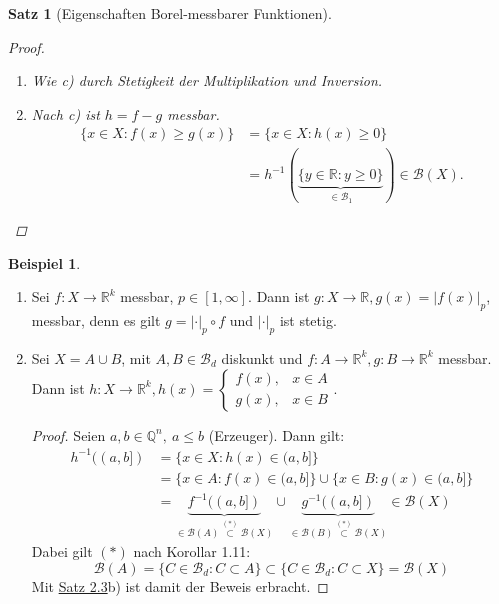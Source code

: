 \documentclass[a4paper]{report}
\newcommand{\R}{\mathbb{R}}
\newcommand{\Q}{\mathbb{Q}}
\newcommand{\Borel}{\mathcal{B}}
\newcommand{\Bd}{\Borel_d}
\newcommand{\jhyperref}[2]{\hyperref[j_#1]{#2}}
\newcommand{\jlink}[1]{\jhyperref{#1}{#1}}
\newcommand{\jabb}[3]{ #1: #2 \rightarrow #3 }
\theoremstyle{plain}
\newtheorem{satz}[thm]{Satz}
\theoremstyle{definition}
\newtheorem*{expl*}{Beispiel}
\begin{document}
{{{\begin{satz}[Eigenschaften Borel-messbarer Funktionen]
\begin{proof}
\begin{enumerate}
            \item Wie c) durch Stetigkeit der Multiplikation und Inversion.
            
            \item 
                Nach c) ist $h=f-g$ messbar.
                \begin{displaymath}
                    \begin{split}
                        \{x\in X : f(x) \ge g(x)\} &= \{x\in X: h(x) \ge 0\} \\
                        &= h^{-1}(\underbrace{\{y \in \R : y \ge 0\}}_{\in \Borel_1}) \in \Borel(X).
                    \end{split}
                \end{displaymath}
        \end{enumerate}
    \end{proof}
\end{satz}

\begin{expl*}
    \begin{enumerate}
        \item
            Sei $\jabb{f}{X}{\R^k}$ messbar, $p\in [1,\infty]$. Dann ist $\jabb{g}{X}{\R}, g(x) = |f(x)|_p$, messbar, denn es gilt $g = |\cdot|_p \circ f$ und $|\cdot|_p$ ist stetig.
        \item
            Sei $X = A\cup B$, mit $A,B\in \Bd$ diskunkt und $\jabb{f}{A}{\R^k}, \jabb{g}{B}{\R^k}$ messbar. Dann ist $\jabb{h}{X}{\R^k}, h(x) = \begin{cases} f(x), & x\in A\\ g(x), & x\in B \end{cases}$.
            \begin{proof}
                Seien $a,b \in \Q^n,\ a\le b$ (Erzeuger). Dann gilt:
                \begin{displaymath}
                    \begin{split}
                    h^{-1}((a,b]) &= \{x\in X : h(x) \in (a,b]\} \\
                                  &= \{x\in A: f(x) \in (a,b]\} \cup \{x\in B : g(x) \in (a,b]\}\\
                                  &= \underbrace{f^{-1}((a,b])}_{\in \Borel(A) \overset{(*)}{\subset} \Borel(X)} \cup \underbrace{g^{-1}((a,b])}_{\in \Borel(B) \overset{(*)}{\subset} \Borel(X)} \in \Borel(X)
                    \end{split}
                \end{displaymath}
                Dabei gilt $(*)$ nach Korollar 1.11:
                \begin{displaymath}
                    \Borel(A) = \{C\in \Bd : C\subset A\} \subset \{C \in \Bd : C\subset X\} = \Borel(X)
                \end{displaymath}
                Mit \jlink{Satz 2.3}b) ist damit der Beweis erbracht.
            \end{proof}
    \end{enumerate}
\end{expl*}

}}}
\end{document}
